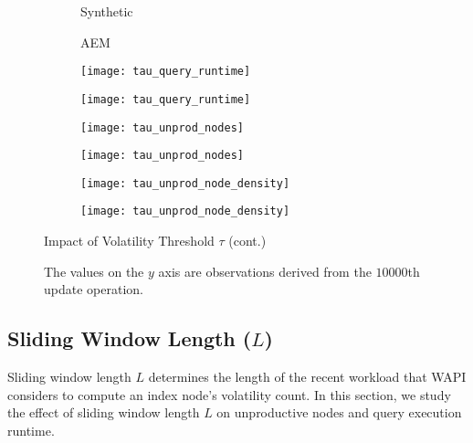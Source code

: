 \documentclass[abstracton,12pt]{scrartcl}
\theoremstyle{definition}
\begin{document}
\begin{figure}[h]\ContinuedFloat
  \centering
  \begin{subfigure}{0.49\linewidth}
    \centering
    Synthetic
  \end{subfigure}
  \begin{subfigure}{0.49\linewidth}
    \centering
    AEM
  \end{subfigure}
  \begin{subfigure}{0.49\linewidth}
    \centering
    \texttt{[image: tau\_query\_runtime]}
    \caption{}
    \label{fig:tau_query_runtime_synthetic}
  \end{subfigure}
  \begin{subfigure}{0.49\linewidth}
    \centering
    \texttt{[image: tau\_query\_runtime]}
    \caption{}
    \label{fig:tau_query_runtime_aem}
  \end{subfigure}
  \begin{subfigure}{0.49\linewidth}
    \centering
    \texttt{[image: tau\_unprod\_nodes]}
    \caption{}
    \label{fig:tau_unprod_nodes_synthetic}
  \end{subfigure}
  \begin{subfigure}{0.49\linewidth}
    \centering
    \texttt{[image: tau\_unprod\_nodes]}
    \caption{}
    \label{fig:tau_unprod_nodes_aem}
  \end{subfigure}
  \begin{subfigure}{0.49\linewidth}
    \centering
    \texttt{[image: tau\_unprod\_node\_density]}
    \caption{}
    \label{fig:tau_unprod_node_density_synthetic}
  \end{subfigure}
  \begin{subfigure}{0.49\linewidth}
    \centering
    \texttt{[image: tau\_unprod\_node\_density]}
    \caption{}
    \label{fig:tau_unprod_node_density_aem}
  \end{subfigure}
  \caption{Impact of Volatility Threshold $\tau$ (cont.)}
  \caption*{\footnotesize The values on the $y$ axis are observations derived from the $10000$th
    update operation. }
  \label{fig:volatility_threshold}
\end{figure}

\subsection{Sliding Window Length ($L$)}

Sliding window length $L$ determines the length of the recent workload that WAPI
considers to compute an index node's volatility count. In this section, we study
the effect of sliding window length $L$ on unproductive nodes and query
execution runtime.
\end{document}
